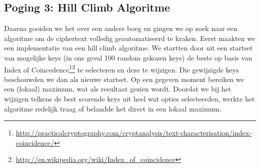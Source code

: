 \subsection{Poging 3: Hill Climb Algoritme}
Daarna gooiden we het over een andere boeg en gingen we op zoek naar een algoritme om de ciphertext volledig geautomatiseerd te kraken. Eerst maakten we een implementatie van een hill climb algoritme. We startten door uit een startset van mogelijke keys (in ons geval 100 random gekozen keys) de beste op basis van Index of Coincedence\footnote{\url{http://practicalcryptography.com/cryptanalysis/text-characterisation/index-coincidence/}}\footnote{\url{http://en.wikipedia.org/wiki/Index_of_coincidence}} te selecteren en deze te wijzigen. Die gewijzigde keys beschouwden we dan als nieuwe startset. Op een gegeven moment bereiken we een (lokaal) maximum, wat als resultaat gezien wordt. Doordat we bij het wijzigen telkens de best scorende keys uit heel wat opties selecteerden, werkte het algoritme redelijk traag of belandde het direct in een lokaal maximum.

